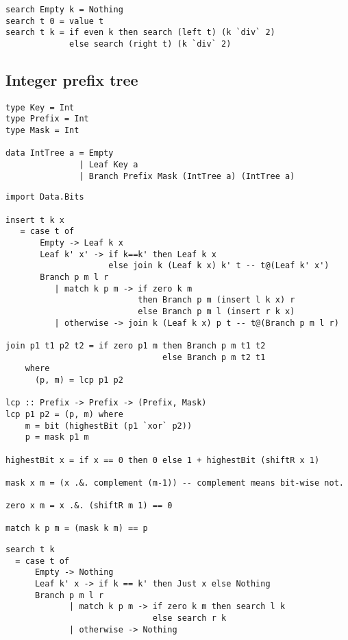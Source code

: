 \documentclass{article}
\begin{document}
\lstset{language=Haskell}
\begin{lstlisting}[caption=Integer trie look up]
search Empty k = Nothing
search t 0 = value t
search t k = if even k then search (left t) (k `div` 2)
             else search (right t) (k `div` 2)
\end{lstlisting}

\subsection{Integer prefix tree}

\lstset{language=Haskell}
\begin{lstlisting}[caption=Integer prefix tree definition]
type Key = Int
type Prefix = Int
type Mask = Int

data IntTree a = Empty
               | Leaf Key a
               | Branch Prefix Mask (IntTree a) (IntTree a)
\end{lstlisting}

\lstset{language=Haskell}
\begin{lstlisting}[caption=Integer prefix tree insertion.]
import Data.Bits

insert t k x
   = case t of
       Empty -> Leaf k x
       Leaf k' x' -> if k==k' then Leaf k x
                     else join k (Leaf k x) k' t -- t@(Leaf k' x')
       Branch p m l r
          | match k p m -> if zero k m
                           then Branch p m (insert l k x) r
                           else Branch p m l (insert r k x)
          | otherwise -> join k (Leaf k x) p t -- t@(Branch p m l r)

join p1 t1 p2 t2 = if zero p1 m then Branch p m t1 t2
                                else Branch p m t2 t1
    where
      (p, m) = lcp p1 p2

lcp :: Prefix -> Prefix -> (Prefix, Mask)
lcp p1 p2 = (p, m) where
    m = bit (highestBit (p1 `xor` p2))
    p = mask p1 m

highestBit x = if x == 0 then 0 else 1 + highestBit (shiftR x 1)

mask x m = (x .&. complement (m-1)) -- complement means bit-wise not.

zero x m = x .&. (shiftR m 1) == 0

match k p m = (mask k m) == p
\end{lstlisting}

\lstset{language=Haskell}
\begin{lstlisting}[caption=Lookup the integer prefix tree]
search t k
  = case t of
      Empty -> Nothing
      Leaf k' x -> if k == k' then Just x else Nothing
      Branch p m l r
             | match k p m -> if zero k m then search l k
                              else search r k
             | otherwise -> Nothing
\end{lstlisting}

\ifx\wholebook\relax \else
\end{document}
